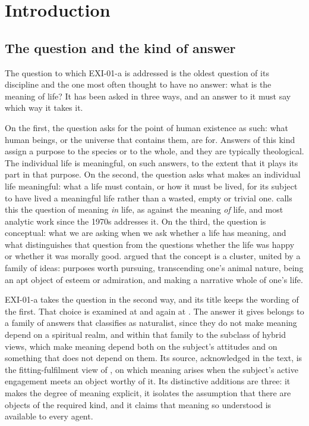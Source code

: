 \section{Introduction}\label{s:intro}

\subsection{The question and the kind of answer}

The question to which EXI-01-a is addressed is the oldest question of its discipline and the one most often thought to have no answer: what is the meaning of life? It has been asked in three ways, and an answer to it must say which way it takes it.

On the first, the question asks for the point of human existence as such: what human beings, or the universe that contains them, are for. Answers of this kind assign a purpose to the species or to the whole, and they are typically theological. The individual life is meaningful, on such answers, to the extent that it plays its part in that purpose. On the second, the question asks what makes an individual life meaningful: what a life must contain, or how it must be lived, for its subject to have lived a meaningful life rather than a wasted, empty or trivial one. \citet{Metz2013} calls this the question of meaning \emph{in} life, as against the meaning \emph{of} life, and most analytic work since the 1970s addresses it. On the third, the question is conceptual: what we are asking when we ask whether a life has meaning, and what distinguishes that question from the questions whether the life was happy or whether it was morally good. \citet{Metz2001} argued that the concept is a cluster, united by a family of ideas: purposes worth pursuing, transcending one's animal nature, being an apt object of esteem or admiration, and making a narrative whole of one's life.

EXI-01-a takes the question in the second way, and its title keeps the wording of the first. That choice is examined at  and again at . The answer it gives belongs to a family of answers that \citet{Metz2013} classifies as naturalist, since they do not make meaning depend on a spiritual realm, and within that family to the subclass of hybrid views, which make meaning depend both on the subject's attitudes and on something that does not depend on them. Its source, acknowledged in the text, is the fitting-fulfilment view of \citet{Wolf1997,Wolf2010}, on which meaning arises when the subject's active engagement meets an object worthy of it. Its distinctive additions are three: it makes the degree of meaning explicit, it isolates the assumption that there are objects of the required kind, and it claims that meaning so understood is available to every agent.


